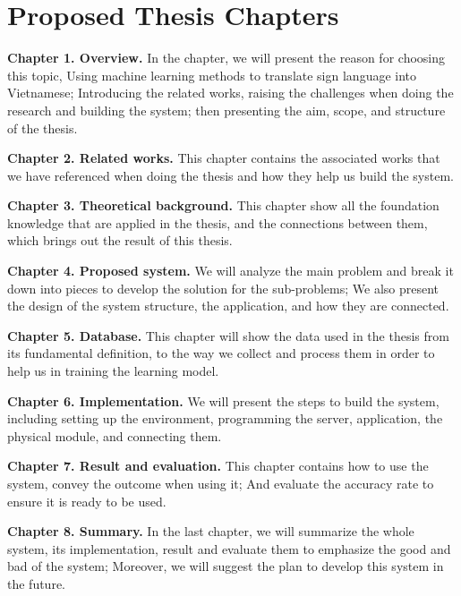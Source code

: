 \chapter{Proposed Thesis Chapters}

\textbf{Chapter 1. Overview.} In the chapter, we will present the reason for choosing this topic, Using machine learning methods to translate sign language into Vietnamese; Introducing the related works, raising the challenges when doing the research and building the system; then presenting the aim, scope, and structure of the thesis.

\textbf{Chapter 2. Related works.} This chapter contains the associated works that we have referenced when doing the thesis and how they help us build the system.

\textbf{Chapter 3. Theoretical background.} This chapter show all the foundation knowledge that are applied in the thesis, and the connections between them, which brings out the result of this thesis. 

\textbf{Chapter 4. Proposed system.} We will analyze the main problem and break it down into pieces to develop the solution for the sub-problems; We also present the design of the system structure, the application, and how they are connected.

\textbf{Chapter 5. Database.} This chapter will show the data used in the thesis from its fundamental definition, to the way we collect and process them in order to help us in training the learning model.

\textbf{Chapter 6. Implementation.} We will present the steps to build the system, including setting up the environment, programming the server, application, the physical module, and connecting them.

\textbf{Chapter 7. Result and evaluation.} This chapter contains how to use the system, convey the outcome when using it; And evaluate the accuracy rate to ensure it is ready to be used.

\textbf{Chapter 8. Summary.} In the last chapter, we will summarize the whole system, its implementation, result and evaluate them to emphasize the good and bad of the system; Moreover, we will suggest the plan to develop this system in the future.
